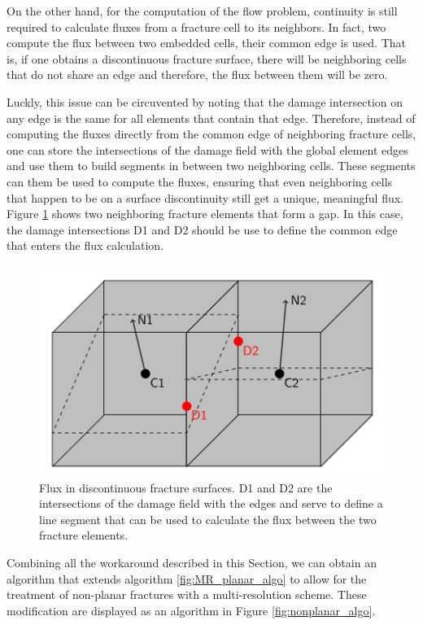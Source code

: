 On the other hand, for the computation of the flow problem, continuity is still required to calculate fluxes from a fracture cell to its neighbors. In fact, two compute the flux between two embedded cells, their common edge is used. That is, if one obtains a discontinuous fracture surface, there will be neighboring cells that do not share an edge and therefore, the flux between them will be zero.

Luckly, this issue can be circuvented by noting that the damage intersection on any edge is the same for all elements that contain that edge. Therefore, instead of computing the fluxes directly from the common edge of neighboring fracture cells, one can store the intersections of the damage field with the global element edges and use them to build segments in between two neighboring cells. These segments can them be used to compute the fluxes, ensuring that even neighboring cells that happen to be on a surface discontinuity still get a unique, meaningful flux. Figure \ref{fig:flux_calculations} shows two neighboring fracture elements that form a gap. In this case, the damage intersections D1 and D2 should be use to define the common edge that enters the flux calculation.

\begin{figure}[h]
    \centering
    \includegraphics[width=0.6\linewidth]{Chapter4/figures/nonplanar/nonplanar_flux.png}
    \caption{Flux in discontinuous fracture surfaces. D1 and D2 are the intersections of the damage field with the edges and serve to define a line segment that can be used to calculate the flux between the two fracture elements.}
    \label{fig:flux_calculations}
\end{figure}

Combining all the workaround described in this Section, we can obtain an algorithm that extends algorithm \ref{fig:MR_planar_algo} to allow for the treatment of non-planar fractures with a multi-resolution scheme. These modification are displayed as an algorithm in Figure \ref{fig:nonplanar_algo}.

